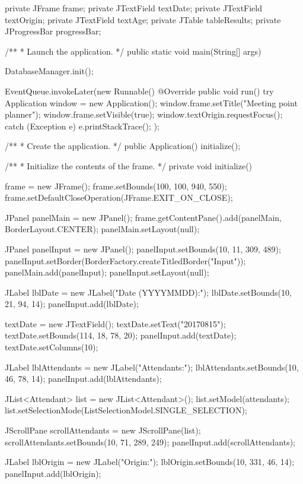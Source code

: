 \begin{javacode}
{  private JFrame frame;
  private JTextField textDate;
  private JTextField textOrigin;
  private JTextField textAge;
  private JTable tableResults;
  private JProgressBar progressBar;

  /**
   * Launch the application.
   */
  public static void main(String[] args) {
    DatabaseManager.init();

    EventQueue.invokeLater(new Runnable() {
      @Override
      public void run() {
        try {
          Application window = new Application();
          window.frame.setTitle("Meeting point planner");
          window.frame.setVisible(true);
          window.textOrigin.requestFocus();
        } catch (Exception e) {
          e.printStackTrace();
        }
      }
    });
  }

  /**
   * Create the application.
   */
  public Application() {
    initialize();
  }

  /**
   * Initialize the contents of the frame.
   */
  private void initialize() {
    frame = new JFrame();
    frame.setBounds(100, 100, 940, 550);
    frame.setDefaultCloseOperation(JFrame.EXIT_ON_CLOSE);

    JPanel panelMain = new JPanel();
    frame.getContentPane().add(panelMain, BorderLayout.CENTER);
    panelMain.setLayout(null);

    JPanel panelInput = new JPanel();
    panelInput.setBounds(10, 11, 309, 489);
    panelInput.setBorder(BorderFactory.createTitledBorder("Input"));
    panelMain.add(panelInput);
    panelInput.setLayout(null);

    JLabel lblDate = new JLabel("Date (YYYYMMDD):");
    lblDate.setBounds(10, 21, 94, 14);
    panelInput.add(lblDate);

    textDate = new JTextField();
    textDate.setText("20170815");
    textDate.setBounds(114, 18, 78, 20);
    panelInput.add(textDate);
    textDate.setColumns(10);

    JLabel lblAttendants = new JLabel("Attendants:");
    lblAttendants.setBounds(10, 46, 78, 14);
    panelInput.add(lblAttendants);

    JList<Attendant> list = new JList<Attendant>();
    list.setModel(attendants);
    list.setSelectionMode(ListSelectionModel.SINGLE_SELECTION);

    JScrollPane scrollAttendants = new JScrollPane(list);
    scrollAttendants.setBounds(10, 71, 289, 249);
    panelInput.add(scrollAttendants);

    JLabel lblOrigin = new JLabel("Origin:");
    lblOrigin.setBounds(10, 331, 46, 14);
    panelInput.add(lblOrigin);

}}
\end{javacode}
